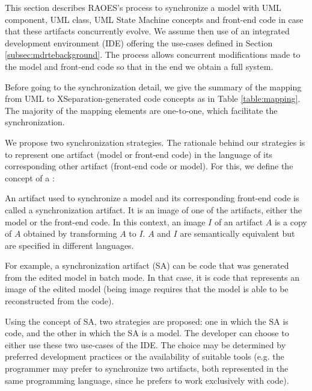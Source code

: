 
This section describes RAOES's process to synchronize a model with UML component, UML class, UML State Machine concepts and front-end code in case that these artifacts concurrently evolve.
We assume then use of an integrated development environment (IDE) %
offering the use-cases defined in Section \ref{subsec:mdrtebackground}. 
The process allows concurrent modifications made to the model
and front-end code so that in the end we obtain a full system.

Before going to the synchronization detail, we give the summary of the mapping from UML to XSeparation-generated code concepts as in Table \ref{table:mapping}.
The majority of the mapping elements are one-to-one, which facilitate the synchronization.


We propose two synchronization strategies.
The rationale behind our strategies
is to represent one artifact (model or front-end code) in the language of its corresponding other artifact (front-end code or model).
For this, we define the
concept of a :

\begin{definition}
	An artifact used to synchronize a model and its corresponding front-end code
	is called a synchronization artifact.
	It is an image of one of the artifacts, either the model or the front-end code.
	In this context, an image $I$ of an artifact $A$ is a copy of $A$ obtained by
	transforming $A$ to $I$. $A$ and $I$ are semantically equivalent but are specified in different languages.
\end{definition}

For example, a synchronization artifact (SA) can be code that was generated from the edited model in batch mode.
In that case, it is code that represents an image of the edited model (being image requires that the model is able to be reconstructed from the code).

Using the concept of SA, two strategies are
proposed: one in which the SA is code,
and the other in which the SA is a model.
The developer can choose to either use these two use-cases of the IDE. 
The choice may be determined by
preferred development practices or the availability of suitable tools (e.g. the programmer
may prefer to synchronize two artifacts, both represented
in the same programming language, since he prefers to
work exclusively with code).


